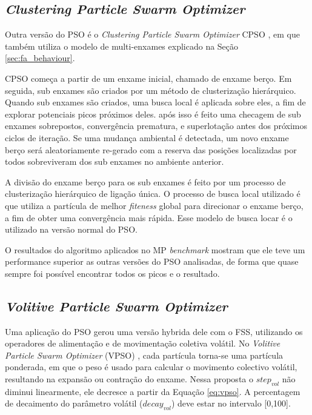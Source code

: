 \subsection{\textit{Clustering Particle Swarm Optimizer}}
\label{sec:cpso}

Outra versão do PSO é o \textit{Clustering Particle Swarm Optimizer} CPSO \cite{yang2010clustering}, em que também utiliza o modelo de multi-enxames explicado na Seção \ref{sec:fa_behaviour}.

CPSO começa a partir de um enxame inicial, chamado de enxame berço. Em seguida, sub enxames são criados por um método de clusterização hierárquico. Quando sub enxames são criados, uma busca local é aplicada sobre eles, a fim de explorar potenciais picos próximos deles. após isso é feito uma checagem de sub enxames sobrepostos, convergência prematura, e superlotação antes dos próximos ciclos de iteração. Se uma mudança ambiental é detectada, um novo enxame berço será aleatoriamente re-gerado com a reserva das posições localizadas por todos sobreviveram dos sub enxames no ambiente anterior.

A divisão do enxame berço para os sub enxames é feito por um processo de clusterização hierárquico de ligação única. O processo de busca local utilizado é que utiliza a partícula de melhor \textit{fiteness} global para direcionar o enxame berço, a fim de obter uma convergência mais rápida. Esse modelo de busca locar é o utilizado na versão normal do PSO. 

O resultados do algoritmo aplicados no MP \textit{benchmark} mostram que ele teve um performance superior as outras versões do PSO analisadas, de forma que quase sempre foi possível encontrar todos os picos e o resultado.

\subsection{\textit{Volitive Particle Swarm Optimizer}}
\label{sec:vpso}

Uma aplicação do PSO gerou uma versão hybrida dele com o FSS, utilizando os operadores de alimentação e de movimentação coletiva volátil. No \textit{Volitive Particle Swarm Optimizer} (VPSO) \cite{cavalcanti2011hybrid}, cada partícula torna-se uma partícula ponderada, em que o peso é usado para calcular o movimento colectivo volátil, resultando na expansão ou contração do enxame. Nessa proposta o $step_{vol}$ não diminui linearmente, ele decresce a partir da Equação \ref{eq:vpso}. A percentagem de decaimento do parâmetro volátil ($decay_{vol}$) deve estar no intervalo [0,100].


